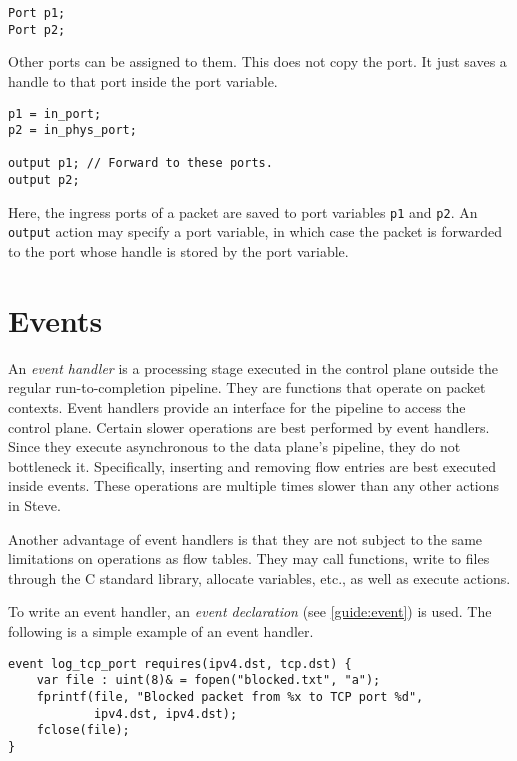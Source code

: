 \begin{codepage}
\begin{lstlisting}
Port p1;
Port p2;
\end{lstlisting}
\end{codepage}

Other ports can be assigned to them. This does not copy the port. It just saves
a handle to that port inside the port variable.

\begin{codepage}
\begin{lstlisting}
p1 = in_port; 
p2 = in_phys_port;

output p1; // Forward to these ports.
output p2;
\end{lstlisting}
\end{codepage}

Here, the ingress ports of a packet are saved to port variables \texttt{p1} and \texttt{p2}. An \texttt{output} action may specify a port variable, in which case the packet is forwarded to the port whose handle is stored by the port variable.

\section{Events} \label{tut:event}

An \textit{event handler} is a processing stage executed in the control plane outside the regular
run-to-completion pipeline. They are
functions that operate on packet contexts. 
Event handlers provide an interface for the pipeline to access the control
plane. Certain slower operations
are best performed by event handlers. Since they execute asynchronous to the
data plane's pipeline, they do not bottleneck it.
Specifically, inserting and removing flow entries are best executed inside
events. These operations are multiple times slower
than any other actions in Steve.

Another advantage of event handlers is that they are not subject to the same
limitations on operations as flow tables. They may call functions,
write to files through the C standard library, allocate variables, etc., as
well as execute actions.

To write an event handler, an \textit{event declaration}
(see \ref{guide:event}) is used. The following is a simple example
of an event handler.

\begin{codepage}
\begin{lstlisting}
event log_tcp_port requires(ipv4.dst, tcp.dst) {
	var file : uint(8)& = fopen("blocked.txt", "a");
	fprintf(file, "Blocked packet from %x to TCP port %d", 
			ipv4.dst, ipv4.dst);
	fclose(file);
}
\end{lstlisting}
\end{codepage}

